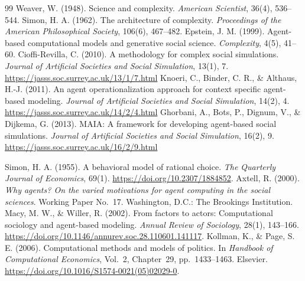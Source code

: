 \documentclass[11pt,a4paper]{article}
\begin{document}
\begingroup\small
\begin{thebibliography}{99}
 Weaver, W. (1948). Science and complexity. \emph{American Scientist}, 36(4), 536--544.
 Simon, H. A. (1962). The architecture of complexity. \emph{Proceedings of the American Philosophical Society}, 106(6), 467--482.
 Epstein, J. M. (1999). Agent-based computational models and generative social science. \emph{Complexity}, 4(5), 41--60.
 Cioffi-Revilla, C. (2010). A methodology for complex social simulations. \emph{Journal of Artificial Societies and Social Simulation}, 13(1), 7. \url{https://jasss.soc.surrey.ac.uk/13/1/7.html}
 Knoeri, C., Binder, C. R., \& Althaus, H.-J. (2011). An agent operationalization approach for context specific agent-based modeling. \emph{Journal of Artificial Societies and Social Simulation}, 14(2), 4. \url{https://jasss.soc.surrey.ac.uk/14/2/4.html}
 Ghorbani, A., Bots, P., Dignum, V., \& Dijkema, G. (2013). MAIA: A framework for developing agent-based social simulations. \emph{Journal of Artificial Societies and Social Simulation}, 16(2), 9. \url{https://jasss.soc.surrey.ac.uk/16/2/9.html}

 Simon, H. A. (1955). A behavioral model of rational choice. \emph{The Quarterly Journal of Economics}, 69(1). \url{https://doi.org/10.2307/1884852}.
 Axtell, R. (2000). \emph{Why agents? On the varied motivations for agent computing in the social sciences}. Working Paper No.~17. Washington, D.C.: The Brookings Institution.
 Macy, M. W., \& Willer, R. (2002). From factors to actors: Computational sociology and agent-based modeling. \emph{Annual Review of Sociology}, 28(1), 143--166. \url{https://doi.org/10.1146/annurev.soc.28.110601.141117}.
 Kollman, K., \& Page, S. E. (2006). Computational methods and models of politics. In \emph{Handbook of Computational Economics}, Vol.~2, Chapter~29, pp.~1433--1463. Elsevier. \url{https://doi.org/10.1016/S1574-0021(05)02029-0}.


\end{thebibliography}
\end{document}
